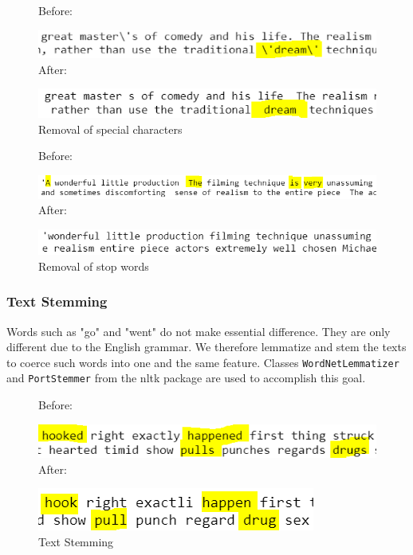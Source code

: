 \documentclass[10pt,twocolumn]{article}
\begin{document}
	\begin{figure}[H]
		\textsf{Before:}
		
		\includegraphics[width = \columnwidth]{special_char}
		\textsf{After:}
		
		\includegraphics[width = \columnwidth]{special_char_removed}
		\caption{Removal of special characters}\label{nltk2}
	\end{figure}
	
	\begin{figure}[H]
		\textsf{Before:}
		
		\includegraphics[width = \columnwidth]{stop_words}
		\textsf{After:}
		
		\includegraphics[width = \columnwidth]{stop_words_removed}
		\caption{Removal of stop words}\label{nltk3}
	\end{figure}
	\subsubsection{Text Stemming}
	Words such as "go" and "went" do not make essential difference. They are only different due to the English grammar. We therefore lemmatize and stem the texts to coerce such words into one and the same feature. Classes \texttt{WordNetLemmatizer} and \texttt{PortStemmer} from the nltk package are used to accomplish this goal.
	\begin{figure}[H]
		\textsf{Before:}
		
		\includegraphics[width = \columnwidth]{stem}
		\textsf{After:}
		
		\includegraphics[width = \columnwidth]{after_stem}
		\caption{Text Stemming}
	\end{figure}
	
\end{document}
